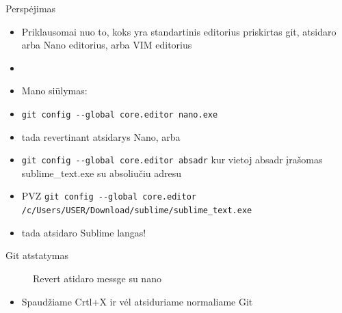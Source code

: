 \documentclass[11pt,xcolor=table]{beamer}
\begin{document}
\begin{frame}[fragile]{Perspėjimas}
\begin{itemize}
\item Priklausomai nuo to, koks yra standartinis editorius priskirtas git, atsidaro arba Nano editorius, arba VIM editorius
\item \href{https://www.youtube.com/watch?v=ggSyF1SVFr4}{\color{blue}{Kadangi VIM papildomas ir nebūtinai reikalingas apsunkinimas, šioje vietoje pridedu tik nuorod į youtube video (8min) kaip dirbti su VIM}}
\item Mano siūlymas:
\item \colorbox{listinggray}{\lstinline|git config --global core.editor nano.exe|}
\item tada revertinant atsidarys Nano, arba
\item \colorbox{listinggray}{\lstinline|git config --global core.editor absadr|} kur vietoj absadr įrašomas sublime\_text.exe su absoliučiu adresu
\item PVZ \colorbox{listinggray}{\lstinline|git config --global core.editor
/c/Users/USER/Download/sublime/sublime_text.exe|}
\item tada atsidaro Sublime langas!
\end{itemize}
\end{frame}

\begin{frame}[fragile]{Git atstatymas}
\begin{figure}
\caption{Revert atidaro messge su nano}
\end{figure}
\begin{itemize}
\item Spaudžiame Crtl+X ir vėl atsiduriame normaliame Git
\end{itemize}
\end{frame}
\end{document}
